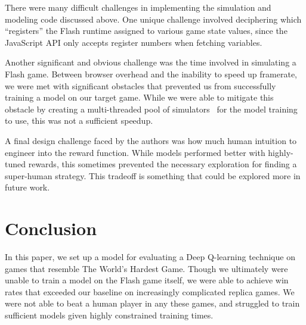 \documentclass[9pt,journal]{IEEEtran}
\begin{document}
There were many difficult challenges in implementing the simulation and modeling code discussed above. One unique challenge involved deciphering which ``registers'' the Flash runtime assigned to various game state values, since the JavaScript API only accepts register numbers when fetching variables.

Another significant and obvious challenge was the time involved in simulating a Flash game. Between browser overhead and the inability to speed up framerate, we were met with significant obstacles that prevented us from successfully training a model on our target game. While we were able to mitigate this obstacle by creating a multi-threaded pool of simulators~\cite{simulatorpool} for the model training to use, this was not a sufficient speedup.

A final design challenge faced by the authors was how much human intuition to engineer into the reward function. While models performed better with highly-tuned rewards, this sometimes prevented the necessary exploration for finding a super-human strategy. This tradeoff is something that could be explored more in future work.

\section{Conclusion}

In this paper, we set up a model for evaluating a Deep Q-learning technique on games that resemble The World's Hardest Game. Though we ultimately were unable to train a model on the Flash game itself, we were able to achieve win rates that exceeded our baseline on increasingly complicated replica games. We were not able to beat a human player in any these games, and struggled to train sufficient models given highly constrained training times.

\pagebreak
\printbibliography
\end{document}
